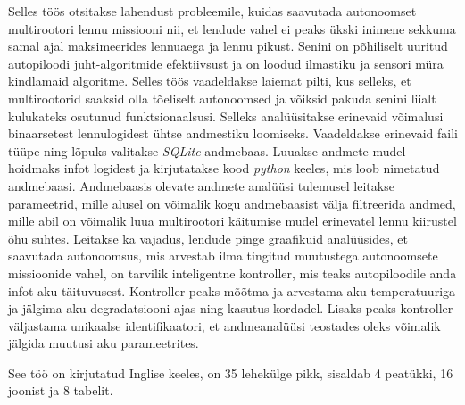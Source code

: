 \documentclass[12pt,oneside]{reedthesis}
\theoremstyle{definition}
\theoremstyle{definition}
\theoremstyle{definition}
\theoremstyle{remark}
\begin{document}
  \begin{annotatsioon}
    Selles töös otsitakse lahendust probleemile, kuidas saavutada
    autonoomset multirootori lennu missiooni nii, et lendude vahel ei peaks
    ükski inimene sekkuma samal ajal maksimeerides lennuaega ja lennu
    pikust. Senini on põhiliselt uuritud autopiloodi juht-algoritmide
    efektiivsust ja on loodud ilmastiku ja sensori müra kindlamaid
    algoritme. Selles töös vaadeldakse laiemat pilti, kus selleks, et
    multirootorid saaksid olla tõeliselt autonoomsed ja võiksid pakuda
    senini liialt kulukateks osutunud funktsionaalsusi. Selleks
    analüüsitakse erinevaid võimalusi binaarsetest lennulogidest ühtse
    andmestiku loomiseks. Vaadeldakse erinevaid faili tüüpe ning lõpuks
    valitakse \emph{SQLite} andmebaas. Luuakse andmete mudel hoidmaks infot
    logidest ja kirjutatakse kood \emph{python} keeles, mis loob nimetatud
    andmebaasi. Andmebaasis olevate andmete analüüsi tulemusel leitakse
    parameetrid, mille alusel on võimalik kogu andmebaasist välja
    filtreerida andmed, mille abil on võimalik luua multirootori käitumise
    mudel erinevatel lennu kiirustel õhu suhtes. Leitakse ka vajadus,
    lendude pinge graafikuid analüüsides, et saavutada autonoomsus, mis
    arvestab ilma tingitud muutustega autonoomsete missioonide vahel, on
    tarvilik inteligentne kontroller, mis teaks autopiloodile anda infot aku
    täituvusest. Kontroller peaks mõõtma ja arvestama aku temperatuuriga ja
    jälgima aku degradatsiooni ajas ning kasutus kordadel. Lisaks peaks
    kontroller väljastama unikaalse identifikaatori, et andmeanalüüsi
    teostades oleks võimalik jälgida muutusi aku parameetrites.
    
    See töö on kirjutatud Inglise keeles, on 35 lehekülge pikk, sisaldab 4
    peatükki, 16 joonist ja 8 tabelit.
  \end{annotatsioon}
\end{document}
